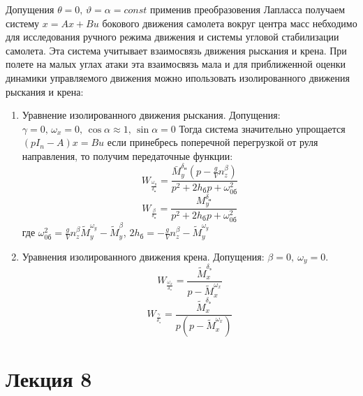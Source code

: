 \documentclass{article}
\begin{document}
Допущения $\theta = 0, \, \vartheta = \alpha = const$ применив преобразовения Лапласса получаем 
систему $x = Ax + Bu$ бокового движения самолета вокруг центра масс небходимо для исследования ручного режима движения и системы угловой стабилизации самолета. Эта система учитывает взаимосвязь движения рыскания и крена. При полете на малых углах атаки эта взаимосвязь мала и для приближенной оценки динамики управляемого движения можно ипользовать изолированного движения рыскания и крена:
\begin{enumerate}
	\item Уравнение изолированного движения рыскания. Допущения: $\gamma = 0, \, \omega_x = 0, \, \cos{\alpha} \approx 1,\,\sin{\alpha} = 0$
	      Тогда система значительно упрощается 
	      $(pI_n - A)x = B u$
	      если принебресь поперечной перегрузкой от руля направления, то получим передаточные функции:
	      \[
              W_{\frac{\omega_y}{\delta_\text{н}}}= \frac{\bar{M}_y^{\delta_\text{н}} (p - \frac{g}{V} n_z^\beta)}{p^2 + 2 h_\text{б}p + \omega^2_{0\text{б}}}
	      \]
	      \[
              W_{\frac{\beta}{\delta_\text{н}}} = \frac{M_y^{\delta_\text{н}}}{p^2 + 2 h_\text{б}p + \omega^2_{0\text{б}}}
	      \]
          где $\omega_{0\text{б}}^2 = \frac{g}{V} n_z^\beta \tilde{M}_y^{\omega_y} - \tilde{M}_y^\beta$, $2h_\text{б} = -\frac{g}{V} n_z^\beta - \tilde{M}_y^{\omega_y}$
	\item Уравнения изолированного движения крена. Допущения: $\beta = 0,\ \omega_y = 0$.
	      \[
              W_{\frac{\omega_x}{\delta_\text{э}}} = \frac{\tilde{M}_x^{\delta_\text{э}}}{p - \tilde{M}_x^{\omega_x}}
	      \]
	      \[
              W_{\frac{\gamma}{\delta_\text{э}}} = \frac{\tilde{M}_x^{\delta_\text{э}}}{p(p - \tilde{M}_x^{\omega_x})}
	      \]
\end{enumerate}
\newpage

\section{Лекция 8}
\end{document}
